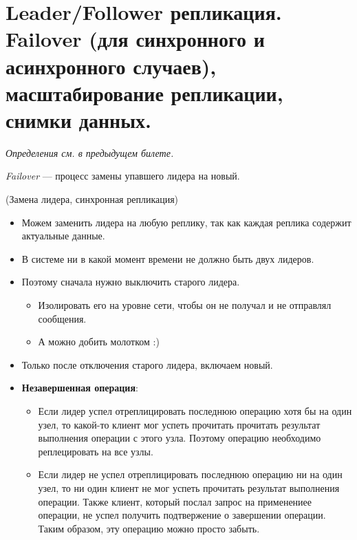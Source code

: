 \section{Leader/Follower репликация. Failover (для синхронного и асинхронного случаев), масштабирование репликации, снимки данных.}

\textit{Определения см. в предыдущем билете.}

\begin{definition}
    \textit{Failover} --- процесс замены упавшего лидера на новый.
\end{definition}

\begin{algorithm}(Замена лидера, синхронная репликация)
    \begin{itemize}
        \item Можем заменить лидера на любую реплику, так как каждая реплика содержит актуальные данные.
        \item В системе ни в какой момент времени не должно быть двух лидеров.

        \item Поэтому сначала нужно выключить старого лидера.
        \begin{itemize}
            \item Изолировать его на уровне сети, чтобы он не получал и не отправлял сообщения.
            \item А можно добить молотком :)
        \end{itemize}

        \item Только после отключения старого лидера, включаем новый.

        \item \textbf{Незавершенная операция}:
        \begin{itemize}
            \item Если лидер успел отреплицировать последнюю операцию хотя бы на один узел, то какой-то клиент мог успеть прочитать прочитать результат выполнения операции с этого узла. Поэтому операцию необходимо реплецировать на все узлы.
            \item Если лидер не успел отреплицировать последнюю операцию ни на один узел, то ни один клиент не мог успеть прочитать результат выполнения операции. Также клиент, который послал запрос на применениее операции, не успел получить подтвержение о завершении операции. Таким образом, эту операцию можно просто забыть.
        \end{itemize}

    \end{itemize}

\end{algorithm}

